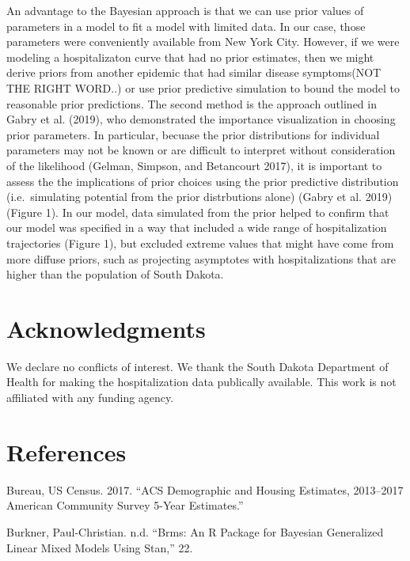 \documentclass[
]{article}
\begin{document}
An advantage to the Bayesian approach is that we can use prior values of parameters in a model to fit a model with limited data. In our case, those parameters were conveniently available from New York City. However, if we were modeling a hospitalizaton curve that had no prior estimates, then we might derive priors from another epidemic that had similar disease symptoms(NOT THE RIGHT WORD..) or use prior predictive simulation to bound the model to reasonable prior predictions. The second method is the approach outlined in Gabry et al. (2019), who demonstrated the importance visualization in choosing prior parameters. In particular, becuase the prior distributions for individual parameters may not be known or are difficult to interpret without consideration of the likelihood (Gelman, Simpson, and Betancourt 2017), it is important to assess the the implications of prior choices using the prior predictive distribution (i.e.~simulating potential from the prior distrbutions alone) (Gabry et al. 2019) (Figure 1). In our model, data simulated from the prior helped to confirm that our model was specified in a way that included a wide range of hospitalization trajectories (Figure 1), but excluded extreme values that might have come from more diffuse priors, such as projecting asymptotes with hospitalizations that are higher than the population of South Dakota.

\hypertarget{acknowledgments}{%
\section{Acknowledgments}\label{acknowledgments}}

We declare no conflicts of interest. We thank the South Dakota Department of Health for making the hospitalization data publically available. This work is not affiliated with any funding agency.

\hypertarget{references}{%
\section{References}\label{references}}

\hypertarget{refs}{}
\leavevmode\hypertarget{ref-bureau_acs_2017}{}%
Bureau, US Census. 2017. ``ACS Demographic and Housing Estimates, 2013--2017 American Community Survey 5-Year Estimates.''

\leavevmode\hypertarget{ref-burkner_brms_nodate}{}%
Burkner, Paul-Christian. n.d. ``Brms: An R Package for Bayesian Generalized Linear Mixed Models Using Stan,'' 22.
\end{document}
